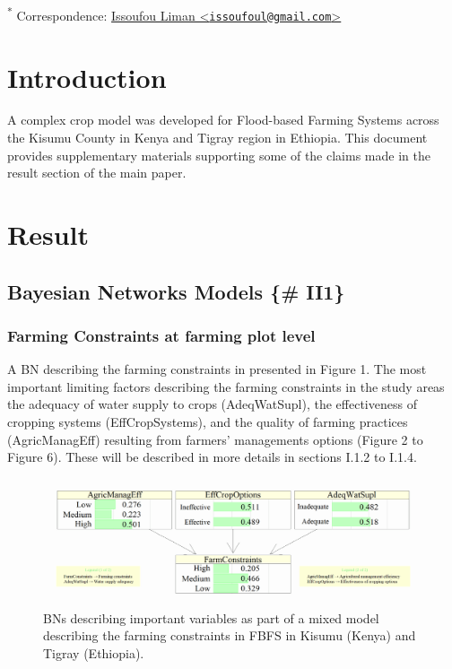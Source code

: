 \documentclass[12pt,oneside]{article}
\begin{document}
\textsuperscript{*} Correspondence: \href{mailto:issoufoul@gmail.com}{Issoufou Liman \textless{}\href{mailto:issoufoul@gmail.com}{\nolinkurl{issoufoul@gmail.com}}\textgreater{}}

\hypertarget{I}{%
\section{Introduction}\label{I}}

A complex crop model was developed for Flood-based Farming Systems across the Kisumu County in Kenya and Tigray region in Ethiopia. This document provides supplementary materials supporting some of the claims made in the result section of the main paper.

\hypertarget{II}{%
\section{Result}\label{II}}

\hypertarget{bayesian-networks-models-ii1}{%
\subsection{Bayesian Networks Models \{\# II1\}}\label{bayesian-networks-models-ii1}}

\hypertarget{I11}{%
\subsubsection{Farming Constraints at farming plot level}\label{I11}}

A BN describing the farming constraints in presented in Figure 1. The most important limiting factors describing the farming constraints in the study areas the adequacy of water supply to crops (AdeqWatSupl), the effectiveness of cropping systems (EffCropSystems), and the quality of farming practices (AgricManagEff) resulting from farmers' managements options (Figure 2 to Figure 6). These will be described in more details in sections I.1.2 to I.1.4.

\begin{figure}[!htbp]

{\centering \includegraphics[width=1\linewidth,]{figures/Modelling_FBFS_Suppl_Farming_Constraints_BNs_plot} 

}

\caption{BNs describing important variables as part of a mixed model describing the farming constraints in FBFS in Kisumu (Kenya) and Tigray (Ethiopia).}\label{fig:fig1}
\end{figure}
\end{document}
